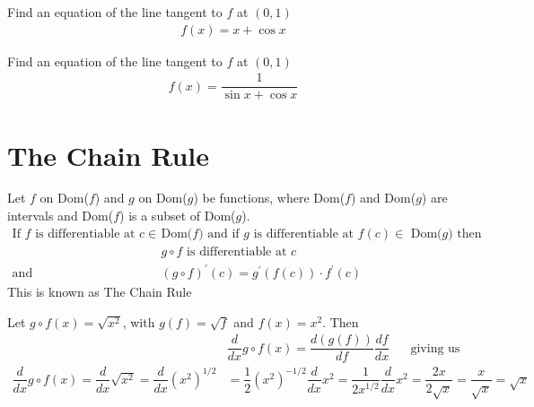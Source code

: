 \begin{exercise}
Find an equation of the line tangent to $f$ at $(0, 1)$
\begin{align*}
    f(x) = x + \cos x
\end{align*}
\end{exercise}

\begin{exercise}
Find an equation of the line tangent to $f$ at $(0, 1)$
\begin{align*}
    f(x) = \dfrac{1}{\sin x + \cos x}
\end{align*}
\end{exercise}

\newpage
\section{The Chain Rule}

\begin{theorem}
Let $f$ on Dom($f$) and $g$ on Dom($g$) be functions, where Dom($f$) and Dom($g$) are intervals and Dom($f$) is a subset of Dom($g$). 
\begin{align*}
    \text{If} \hspace{4pt} f \hspace{4pt} \text{is differentiable at} \hspace{4pt} c \in \hspace{4pt} &\text{Dom($f$) and if} \hspace{4pt} g \hspace{4pt} \text{is differentiable at} \hspace{4pt} f(c) \in \hspace{4pt} \text{Dom($g$) then}\\[2ex]
    &g \circ f \hspace{4pt} \text{is differentiable at} \hspace{4pt} c\\[2ex]
    \text{and} \hspace{4pt} &(g\circ f)^{'}(c) = g^{'}(f(c))\cdot f^{'}(c)
\end{align*}
This is known as The Chain Rule
\end{theorem}

\begin{example}
Let $g\circ f(x) = \sqrt{x^{2}}$, with $g(f) = \sqrt{f}$ and $f(x) = x^{2}$. Then
\begin{align*}
    &\dfrac{d}{dx}g\circ f(x) = \dfrac{d(g(f))}{df}\dfrac{df}{dx} \hspace{20pt} \text{giving us}\\[2ex]
    \dfrac{d}{dx}g\circ f(x) = \dfrac{d}{dx}\sqrt{x^{2}} = \dfrac{d}{dx}(x^{2})^{1/2} &= \dfrac{1}{2}(x^{2})^{-1/2}\dfrac{d}{dx}x^{2} = \dfrac{1}{2x^{1/2}}\dfrac{d}{dx}x^{2} = \dfrac{2x}{2\sqrt{x}} = \dfrac{x}{\sqrt{x}} = \sqrt{x}
\end{align*}
\end{example}

